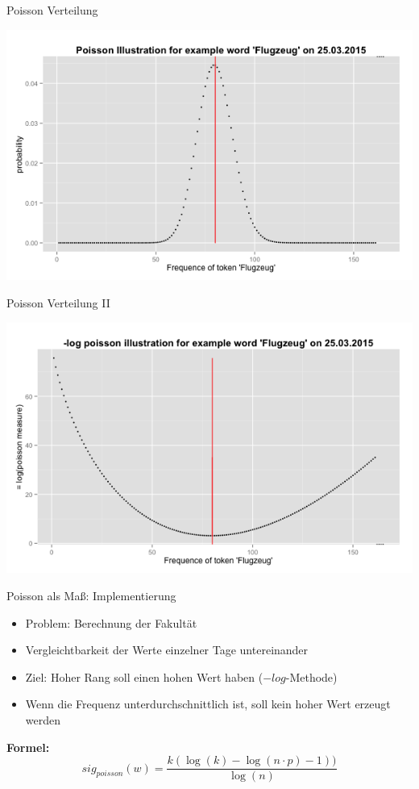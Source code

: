 \documentclass{beamer}
\begin{document}
\begin{frame}{Poisson Verteilung}
	  \begin{centering}
	  \includegraphics[width=1\textwidth]{pictures/poissonVerteilungFlugzeug.png}
	\end{centering}
\end{frame}
\begin{frame}{Poisson Verteilung II}
	  \begin{centering}
	  \includegraphics[width=1\textwidth]{pictures/logPoissonVerteilungFlugzeug.png}
	\end{centering}
\end{frame}


\begin{frame}{Poisson als Ma\ss : Implementierung}
	\begin{itemize}
 		\item Problem: Berechnung der Fakult\"at
 		\item Vergleichtbarkeit der Werte einzelner Tage untereinander 
 		\item Ziel: Hoher Rang soll einen hohen Wert haben ($-log$-Methode)
		\item Wenn die Frequenz unterdurchschnittlich ist, soll kein hoher Wert erzeugt werden
	 \end{itemize}
	 \textbf{Formel:}
	 \begin{equation}
		sig_{poisson}(w) = \frac{k(\log(k)-\log(n\cdot p) -1 ))}{\log(n)}
	\end{equation}
\end{frame}
\end{document}
